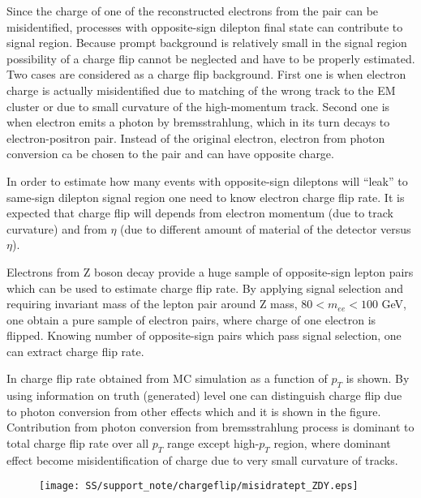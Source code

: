 Since the charge of one of the reconstructed electrons from the pair can be misidentified, 
processes with opposite-sign dilepton final state can contribute to signal region.
Because prompt background is relatively small in the signal region possibility of a charge flip cannot be neglected and have to be properly estimated. 
Two cases are considered as a charge flip background. 
First one is when electron charge is actually misidentified due to matching of the wrong track to the EM cluster or due to small curvature of the high-momentum track. 
Second one is when electron emits a photon by bremsstrahlung, which in its turn decays to electron-positron pair. 
Instead of the original electron, electron from photon conversion ca be chosen to the pair and can have opposite charge.

In order to estimate how many events with opposite-sign dileptons will ``leak'' to same-sign dilepton signal region one
need to know electron charge flip rate. It is expected that charge flip will depends from electron momentum (due to track curvature) 
and from $\eta$ (due to different amount of material of the detector versus $\eta$).

Electrons from Z boson decay provide a huge sample of opposite-sign lepton pairs which can be used to estimate charge flip rate. 
By applying signal selection
and requiring invariant mass of the lepton pair around Z mass, $80 < m_{ee} < 100$ GeV, one obtain a pure
sample of electron pairs, where charge of one electron is flipped. Knowing number of opposite-sign pairs which pass signal selection, 
one can extract charge flip rate.

In  charge flip rate obtained from MC simulation as a function of $p_T$ is shown.
By using information on truth (generated) level one can distinguish charge flip due to photon conversion from other effects which and it is shown in the figure.
Contribution from photon conversion from bremsstrahlung process is dominant 
to total charge flip rate over all $p_T$ range except high-$p_T$ region, where dominant effect become misidentification 
of charge due to very small curvature of tracks.

\begin{figure}
\begin{center}
 \texttt{[image: SS/support\_note/chargeflip/misidratept\_ZDY.eps]}
\caption{\toDo[caption]}
\label{fig:chargeFlip_structure}
\end{center}
\end{figure}

